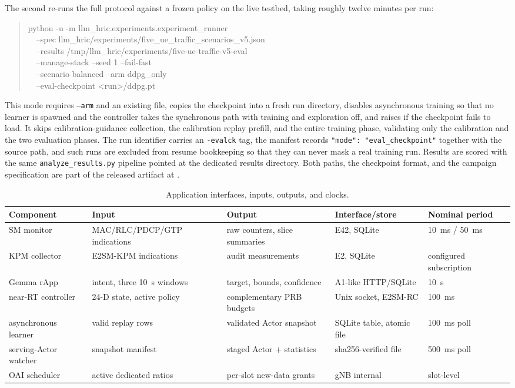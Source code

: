 The second re-runs the full protocol against a frozen policy on the live testbed, taking roughly twelve minutes per run:
\begin{quote}\footnotesize\ttfamily
python -u -m llm\_hric.experiments.experiment\_runner\\
\ \ --spec llm\_hric/experiments/five\_ue\_traffic\_scenarios\_v5.json\\
\ \ --results /tmp/llm\_hric/experiments/five-ue-traffic-v5-eval\\
\ \ --manage-stack --seed 1 --fail-fast\\
\ \ --scenario balanced --arm ddpg\_only\\
\ \ --eval-checkpoint <run>/ddpg.pt
\end{quote}
This mode requires \texttt{--arm} and an existing file, copies the checkpoint into a fresh run directory, disables asynchronous training so that no learner is spawned and the controller takes the synchronous path with training and exploration off, and raises if the checkpoint fails to load. It skips calibration-guidance collection, the calibration replay prefill, and the entire training phase, validating only the calibration and the two evaluation phases. The run identifier carries an \texttt{-evalck} tag, the manifest records \texttt{"mode": "eval\_checkpoint"} together with the source path, and such runs are excluded from resume bookkeeping so that they can never mask a real training run. Results are scored with the same \texttt{analyze\_results.py} pipeline pointed at the dedicated results directory. Both paths, the checkpoint format, and the campaign specification are part of the released artifact at \codeurlprinted.

\begin{table}[t]
\centering
\caption{Application interfaces, inputs, outputs, and clocks.}
\label{tab:apps}
\begin{tabular}{lllll}
\toprule
Component & Input & Output & Interface/store & Nominal period\\
\midrule
SM monitor & MAC/RLC/PDCP/GTP indications & raw counters, slice summaries & E42, SQLite & 10~ms / 50~ms\\
KPM collector & E2SM-KPM indications & audit measurements & E2, SQLite & configured subscription\\
Gemma rApp & intent, three 10~s windows & target, bounds, confidence & A1-like HTTP/SQLite & 10~s\\
near-RT controller & 24-D state, active policy & complementary PRB budgets & Unix socket, E2SM-RC & 100~ms\\
asynchronous learner & valid replay rows & validated Actor snapshot & SQLite table, atomic file & 100~ms poll\\
serving-Actor watcher & snapshot manifest & staged Actor + statistics & sha256-verified file & 500~ms poll\\
OAI scheduler & active dedicated ratios & per-slot new-data grants & gNB internal & slot-level\\
\bottomrule
\end{tabular}
\end{table}
